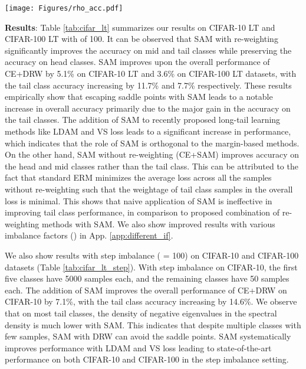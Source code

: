 \documentclass{article}
\begin{document}
\begin{table}[t]
\begin{minipage}{0.6\linewidth}
\begin{adjustbox}{max width=\linewidth}
\begin{tabular}{l|lll | lll}
    
    \bottomrule
  \end{tabular}
   \end{adjustbox}
	\end{minipage}\hfill
	\begin{minipage}{0.35\linewidth}
      \centering
      \texttt{[image: Figures/rho\_acc.pdf]}
      \label{fig:rhovsacc}

	\end{minipage}
\end{table}


\textbf{Results}:
Table \ref{tab:cifar_lt} summarizes our results on CIFAR-10 LT and CIFAR-100 LT with  of 100. It can be observed that SAM with re-weighting significantly improves the accuracy on mid and tail classes while preserving the accuracy on head classes. SAM improves upon the overall performance of CE+DRW by 5.1\% on CIFAR-10 LT and 3.6\% on CIFAR-100 LT datasets, with the tail class accuracy increasing by 11.7\% and 7.7\% respectively. These results empirically show that escaping saddle points with SAM leads to a notable increase in overall accuracy primarily due to the major gain in the accuracy on the tail classes. The addition of SAM to recently proposed long-tail learning methods like LDAM and VS loss leads to a significant increase in performance, which indicates that the role of SAM is orthogonal to the margin-based methods. On the other hand, SAM without re-weighting (CE+SAM) improves accuracy on the head and mid classes rather than the tail class. This can be attributed to the fact that standard ERM minimizes the average loss across all the samples without re-weighting such that the weightage of tail class samples in the overall loss is minimal. This shows that naive application of SAM is ineffective in improving tail class performance, in comparison to proposed combination of re-weighting methods with SAM. We also show improved results with various imbalance factors () in App. \ref{app:different_if}.



We also show results with step imbalance ( = 100) on CIFAR-10 and CIFAR-100 datasets (Table \ref{tab:cifar_lt_step}). With step imbalance on CIFAR-10, the first five classes have 5000 samples each, and the remaining classes have 50 samples each. The addition of SAM improves the overall performance of CE+DRW on CIFAR-10 by 7.1\%, with the tail class accuracy increasing by 14.6\%. We observe that on most tail classes, the density of negative eigenvalues in the spectral density is much lower with SAM. This indicates that despite multiple classes with few samples, SAM with DRW can avoid the saddle points. SAM systematically improves performance with LDAM and VS loss leading to state-of-the-art performance on both CIFAR-10 and CIFAR-100 in the step imbalance setting. 
\end{document}
